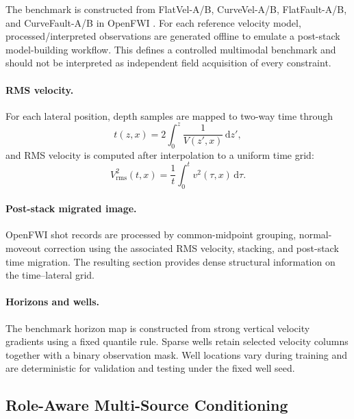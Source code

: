 \documentclass[remotesensing,article,submit,pdftex,moreauthors]{Definitions/mdpi}
\begin{document}
The benchmark is constructed from FlatVel-A/B, CurveVel-A/B, FlatFault-A/B, and CurveFault-A/B in OpenFWI \citep{deng2022openfwi}. For each reference velocity model, processed/interpreted observations are generated offline to emulate a post-stack model-building workflow. This defines a controlled multimodal benchmark and should not be interpreted as independent field acquisition of every constraint.

\paragraph{RMS velocity.}
For each lateral position, depth samples are mapped to two-way time through
\begin{equation}
t(z,x)=2\int_0^z \frac{1}{V(z',x)}\,\mathrm{d}z',
\end{equation}
and RMS velocity is computed after interpolation to a uniform time grid:
\begin{equation}
V_{\mathrm{rms}}^2(t,x)=\frac{1}{t}\int_0^t v^2(\tau,x)\,\mathrm{d}\tau.
\end{equation}

\paragraph{Post-stack migrated image.}
OpenFWI shot records are processed by common-midpoint grouping, normal-moveout correction using the associated RMS velocity, stacking, and post-stack time migration. The resulting section provides dense structural information on the time--lateral grid.

\paragraph{Horizons and wells.}
The benchmark horizon map is constructed from strong vertical velocity gradients using a fixed quantile rule. Sparse wells retain selected velocity columns together with a binary observation mask. Well locations vary during training and are deterministic for validation and testing under the fixed well seed.

\subsection{Role-Aware Multi-Source Conditioning}
\end{document}
